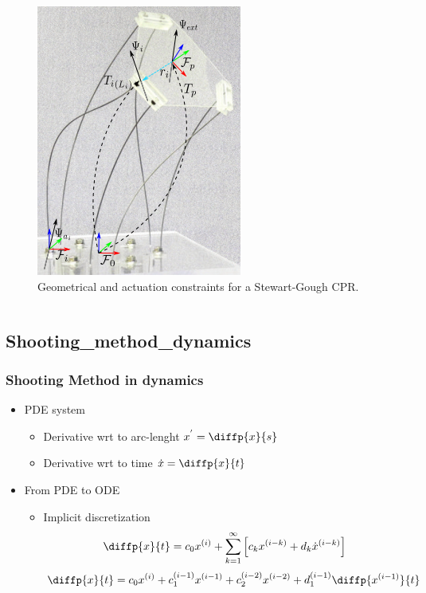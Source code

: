 \documentclass[compress]{thesisbeamer}
\begin{document}
\begin{frame}
\begin{columns}
\begin{figure}[h]
				\includegraphics[height=0.7\textheight]{images/BVP}
				\caption{Geometrical and actuation constraints for a Stewart-Gough CPR.}
			\end{figure}
			\end{columns}
		\end{frame}
		
		\subsection{Shooting_method_dynamics}
        \begin{frame}
        	\frametitle{Shooting Method in dynamics}
			\begin{itemize}%
				\item PDE system
				\begin{itemize}
					\item Derivative wrt to arc-lenght $ x^{'} = \diffp{x}{s} $
					\item Derivative wrt to time $\dot{x} = \diffp{x}{t} $
				\end{itemize}
				\item From PDE to ODE
				\begin{itemize}
					\item Implicit discretization
					\begin{equation}
						\diffp{x}{t} = {c}_{0} {x}^{(i)} + \sum_{k=1}^{\infty} {\left[{c}_{k} {x}^{\left(i-k \right)} + {d}_{k} {\dot{x}} ^ {\left(i-k \right)} \right]}
					\end{equation}
					\begin{equation}
						\diffp{x}{t} = {c}_{0} {x} ^ {\left(i \right)} + {c}_{1}^{\left(i-1 \right)} {x} ^ {\left(i-1 \right)} + {c}_{2}^{\left(i-2 \right)} {x} ^ {\left(i-2 \right)} + {d}_{1}^{\left(i-1 \right)} \diffp{x^{\left(i-1 \right)}}{t}
					\end{equation}
				\end{itemize}
 			\end{itemize}
		\end{frame}
		
\end{document}
